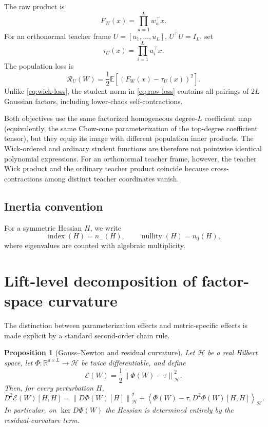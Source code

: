 \documentclass[11pt]{article}
\newtheorem{proposition}[theorem]{Proposition}
\newcommand{\R}{\mathbb{R}}
\newcommand{\ind}{\operatorname{index}}
\newcommand{\nul}{\operatorname{nullity}}
\newcommand{\ip}[2]{\left\langle #1,#2\right\rangle}
\newcommand{\norm}[1]{\left\lVert #1\right\rVert}
\begin{document}
The raw product is
\[
F_W(x)=\prod_{a=1}^{L}w_a^\top x.
\]
For an orthonormal teacher frame $U=[u_1,\ldots,u_L]$, $U^\top U=I_L$, set
\[
\tau_U(x)=\prod_{i=1}^{L}u_i^\top x.
\]
The population loss is
\begin{equation}
\mathcal R_U(W)=\frac12\mathbb E[(F_W(x)-\tau_U(x))^2].
\label{eq:raw-loss}
\end{equation}
Unlike \eqref{eq:wick-loss}, the student norm in \eqref{eq:raw-loss} contains all pairings of $2L$ Gaussian factors, including lower-chaos self-contractions.

Both objectives use the same factorized homogeneous degree-$L$ coefficient map (equivalently, the same Chow-cone parameterization of the top-degree coefficient tensor), but they equip its image with different population inner products.  The Wick-ordered and ordinary student functions are therefore not pointwise identical polynomial expressions.  For an orthonormal teacher frame, however, the teacher Wick product and the ordinary teacher product coincide because cross-contractions among distinct teacher coordinates vanish.

\subsection{Inertia convention}
For a symmetric Hessian $H$, we write
\[
\ind(H)=n_-(H),\qquad \nul(H)=n_0(H),
\]
where eigenvalues are counted with algebraic multiplicity.

\section{Lift-level decomposition of factor-space curvature}
\label{sec:lift-decomposition}

The distinction between parameterization effects and metric-specific effects is made explicit by a standard second-order chain rule.

\begin{proposition}[Gauss--Newton and residual curvature]
\label{prop:chain-rule-curvature}
Let $\mathcal H$ be a real Hilbert space, let $\Phi:\R^{d\times L}\to\mathcal H$ be twice differentiable, and define
\[
\mathcal E(W)=\frac12\norm{\Phi(W)-\tau}_{\mathcal H}^2.
\]
Then, for every perturbation $H$,
\begin{equation}
D^2\mathcal E(W)[H,H]
=
\norm{D\Phi(W)[H]}_{\mathcal H}^2
+
\ip{\Phi(W)-\tau}{D^2\Phi(W)[H,H]}_{\mathcal H}.
\label{eq:chain-rule-curvature}
\end{equation}
In particular, on $\ker D\Phi(W)$ the Hessian is determined entirely by the residual-curvature term.
\end{proposition}
\end{document}
